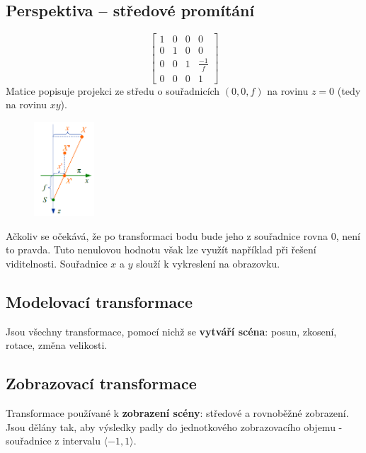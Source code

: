 \subsection{Perspektiva -- středové promítání}
\begin{equation*}
			 \begin{bmatrix}
			     1 & 0 & 0 & 0       \\[0.3em]
    			 0 & 1 & 0 & 0       \\[0.3em]
     			 0 & 0 & 1 & \frac{-1}{f} 	\\[0.3em]
     			 0 & 0 &  0 & 1       
			  \end{bmatrix}
		\end{equation*}
Matice popisuje projekci ze středu o souřadnicích $(0, 0, f)$ na rovinu $z = 0$ (tedy na rovinu  $xy$).
\begin{figure}[H]
\centering
\includegraphics[width=0.2\textwidth]{assets/2_stredove_promitani}
\end{figure}
Ačkoliv se očekává, že po transformaci bodu bude jeho z souřadnice rovna $0$, není to pravda. Tuto nenulovou hodnotu však lze využít například při řešení viditelnosti. Souřadnice $x$ a $y$ slouží k vykreslení na obrazovku.
\subsection{Modelovací transformace}
Jsou všechny transformace, pomocí nichž se \textbf{vytváří scéna}: posun, zkosení, rotace, změna velikosti.

\subsection{Zobrazovací transformace}
Transformace používané k \textbf{zobrazení scény}: středové a rovnoběžné zobrazení. Jsou dělány tak, aby výsledky padly do jednotkového zobrazovacího objemu - souřadnice z intervalu $\langle -1, 1 \rangle$. 